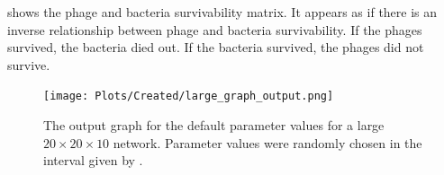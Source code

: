  shows the phage and bacteria survivability matrix. 
It appears as if there is an inverse relationship between phage and bacteria survivability. 
If the phages survived, the bacteria died out. 
If the bacteria survived, the phages did not survive. 

\begin{figure}[]
    \texttt{[image: Plots/Created/large\_graph\_output.png]}
    \centering
    \caption{
        The output graph for the default parameter values for a large $20\times 20 \times 10$ network. 
        Parameter values were randomly chosen in the interval given by . 
    \label{fig:created:survivability}
    }
\end{figure}
